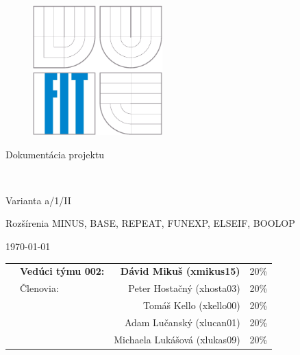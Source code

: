 \begin{titlepage}

\begin{figure}[!h]
  \centering
  \includegraphics[height=5cm]{img/logo.eps}
\end{figure}

\vfill

\begin{center}
\begin{Large}
Dokumentácia projektu\\
\end{Large}

\bigskip

	\begin{Huge}
		\projname\\
	\end{Huge}

	\begin{large}
		Varianta a/1/II\\
		{\small Rozšírenia MINUS, BASE, REPEAT, FUNEXP, ELSEIF, BOOLOP \par}
	\end{large}
\end{center}

\vfill

\begin{center}
\begin{Large}
\today
\end{Large}
\end{center}

\vfill

\begin{flushleft}

	\begin{large}
		\begin{tabularx}{\linewidth}{Xlrl}
		   & \textbf{Vedúci týmu 002:} & \textbf{Dávid Mikuš (xmikus15)} & 20\% \\
		   & Členovia: & Peter Hostačný (xhosta03) & 20\% \\
		   &           & Tomáš Kello (xkello00) & 20\% \\
		   &           & Adam Lučanský (xlucan01) & 20\% \\
		   &           & Michaela Lukášová (xlukas09) & 20\%
		\end{tabularx}
	\end{large}
\end{flushleft}
\end{titlepage}
